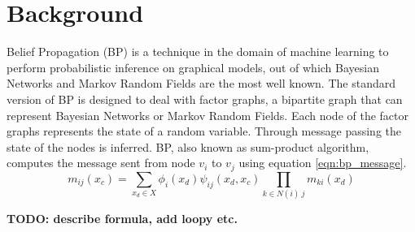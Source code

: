 \section{Background}\label{sec:background}


Belief Propagation (BP) is a technique in the domain of machine learning to perform probabilistic inference on graphical models, out of which Bayesian Networks and Markov Random Fields are the most well known. The standard version of BP is designed to deal with factor graphs, a bipartite graph that can represent Bayesian Networks or Markov Random Fields. Each node of the factor graphs represents the state of a random variable. Through message passing the state of the nodes is inferred. BP, also known as sum-product algorithm, computes the message sent from node $v_i$ to $v_j$ using equation \ref{eqn:bp_message}.
\begin{equation}                                                            
\label{eqn:bp_message}
m_{ij}(x_c) = \sum_{x_d \in X}\phi_i(x_d)\psi_{ij}(x_d,x_c)\prod_{k \in N(i) \ j}m_{ki}(x_d)
\end{equation}

\textbf{TODO: describe formula, add loopy etc.} \\


